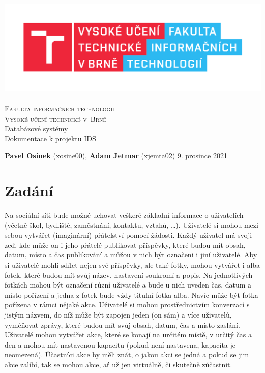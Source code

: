 \documentclass[11pt,a4paper]{article}
\begin{document}
\begin{titlepage}
    \begin{center}
        \includegraphics[height = 160pt]{FIT_logo}\\
		
		{\Huge \textsc{Fakulta informačních technologií}\\[5pt]}
		{\Huge \textsc{Vysoké učení technické v~Brně}}\\
		{\LARGE Databázové systémy\\[5pt]}
		{\LARGE Dokumentace k projektu IDS\\[30pt]}

    \end{center}
    {
        \textbf{Pavel Osinek} (xosine00), \textbf{Adam Jetmar} (xjemta02)
		\hfill
		9. prosince 2021
	}
\end{titlepage}

\newpage
\tableofcontents
\newpage

\section{Zadání}
Na sociální síti bude možné uchovat veškeré základní informace o uživatelích
(včetně škol, bydliště, zaměstnání, kontaktu, vztahů, \dots). Uživatelé si mohou 
mezi sebou vytvářet (imaginární) přátelství pomocí žádosti. Každý uživatel
má svoji zeď, kde může on i jeho přátelé publikovat příspěvky, které budou 
mít obsah, datum, místo a čas publikování a můžou v nich být označeni i jiní 
uživatelé. Aby si uživatelé mohli sdílet nejen své příspěvky, ale také fotky,
mohou vytvářet i alba fotek, které budou mít svůj název, nastavení soukromí 
a popis. Na jednotlivých fotkách mohou být označení různí uživatelé a bude 
u nich uveden čas, datum a místo pořízení a jedna z fotek bude vždy titulní 
fotka alba. Navíc může být fotka pořízena v rámci nějaké akce. Uživatelé si 
mohou prostřednictvím konverzací s jistým názvem, do níž může být zapojen
jeden (on sám) a více uživatelů, vyměňovat zprávy, které budou mít svůj 
obsah, datum, čas a místo zaslání. Uživatelé mohou vytvářet akce, které se 
konají na určitém místě, v určitý čas a den a mohou mít nastavenou kapacitu (pokud není nastavena, kapacita je neomezená). Účastníci akce by měli znát, o 
jakou akci se jedná a pokud se jim akce zalíbí, tak se mohou akce, ať už jen 
virtuálně, či skutečně zúčastnit.
        
\end{document}
